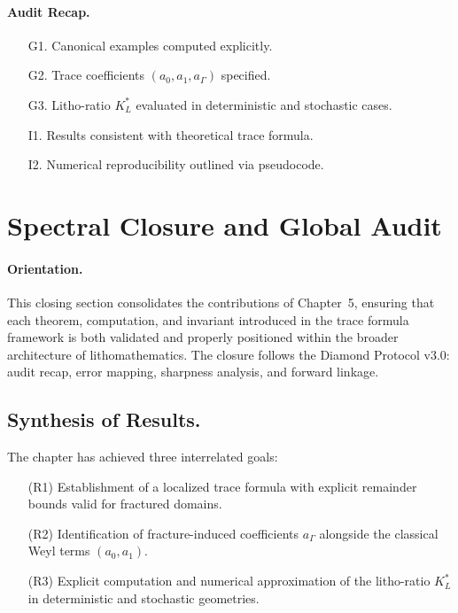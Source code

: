 \paragraph{Audit Recap.}
\begin{itemize}
\item[G1.] Canonical examples computed explicitly.
\item[G2.] Trace coefficients $(a_0,a_1,a_\Gamma)$ specified.
\item[G3.] Litho-ratio $K_L^*$ evaluated in deterministic and stochastic cases.
\item[I1.] Results consistent with theoretical trace formula.
\item[I2.] Numerical reproducibility outlined via pseudocode.
\end{itemize}


\section{Spectral Closure and Global Audit}

\paragraph{Orientation.}
This closing section consolidates the contributions of Chapter~5,
ensuring that each theorem, computation, and invariant introduced in the
trace formula framework is both validated and properly positioned within
the broader architecture of lithomathematics. The closure follows the
Diamond Protocol v3.0: audit recap, error mapping, sharpness analysis,
and forward linkage.


\subsection{Synthesis of Results.}

The chapter has achieved three interrelated goals:

\begin{itemize}
  \item[(R1)] Establishment of a localized trace formula with explicit
  remainder bounds valid for fractured domains.
  \item[(R2)] Identification of fracture-induced coefficients
  $a_\Gamma$ alongside the classical Weyl terms $(a_0,a_1)$.
  \item[(R3)] Explicit computation and numerical approximation of the
  litho-ratio $K_L^*$ in deterministic and stochastic geometries.
\end{itemize}

